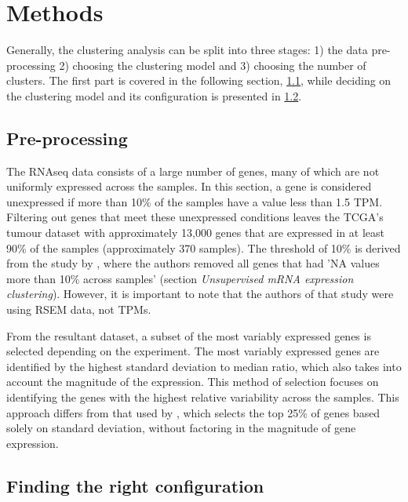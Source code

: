 \section{Methods} \label{s:cs:methods}



Generally, the clustering analysis can be split into three stages: 1) the data pre-processing 2) choosing the clustering model and 3) choosing the number of clusters. The first part is covered in the following section, \ref{s:cs:pre-processing}, while deciding on the clustering model and its configuration is presented in \cref{s:cs:right_config}.


\subsection{Pre-processing} \label{s:cs:pre-processing}

The RNAseq data consists of a large number of genes, many of which are not uniformly expressed across the samples. In this section, a gene is considered unexpressed if more than 10\% of the samples have a value less than 1.5 TPM. Filtering out genes that meet these unexpressed conditions leaves the TCGA's tumour dataset with approximately 13,000 genes that are expressed in at least 90\% of the samples (approximately 370 samples). The threshold of 10\% is derived from the study by \citet{Robertson2017-mg}, where the authors removed all genes that had 'NA values more than 10\% across samples' (section \textit{Unsupervised mRNA expression clustering}). However, it is important to note that the authors of that study were using RSEM data, not TPMs.

From the resultant dataset, a subset of the most variably expressed genes is selected depending on the experiment. The most variably expressed genes are identified by the highest standard deviation to median ratio, which also takes into account the magnitude of the expression. This method of selection focuses on identifying the genes with the highest relative variability across the samples. This approach differs from that used by \citet{Robertson2017-mg}, which selects the top 25\% of genes based solely on standard deviation, without factoring in the magnitude of gene expression.



\subsection{Finding the right configuration} \label{s:cs:right_config}

